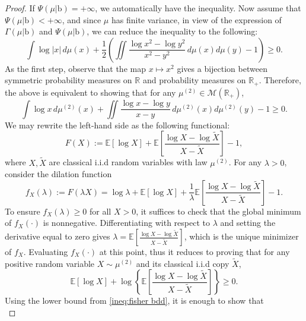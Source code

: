 \documentclass[10pt, reqno]{amsart}
\numberwithin{equation}{section}
\theoremstyle{definition}
\theoremstyle{plain}
\theoremstyle{remark}
\newcommand{\R}{\mathbb{R}}
\newcommand{\E}{\mathbb{E}}
\newcommand{\1}{\mathbbm{1}}
\begin{document}
	\begin{proof}
    If $\Psi(\mu|\mathbb{\mathrm{b}})=+\infty$, we automatically have the inequality. Now assume that $\Psi(\mu|\mathbb{\mathrm{b}})<+\infty$, and since $\mu$ has finite variance, in view of the expression of $\Gamma(\mu|\mathbb{\mathrm{b}})$ and $\Psi(\mu|\mathbb{\mathrm{b}})$, we can reduce the inequality to the following:
	\begin{equation*}
		\int \log|x|\,d\mu(x)+\frac{1}{2}\left( \iint \frac{\log x^2-\log y^2}{x^2-y^2}\,d\mu(x)d\mu(y)-1 \right)\geq 0.
	\end{equation*}
		As the first step, observe that the map $x\mapsto x^2$ gives a bijection between symmetric probability measures on $\R$ and probability measures on $\R_+$. Therefore, the above is equivalent to showing that for any $\mu^{(2)}\in\mathcal{M}(\R_+)$,
		\begin{equation*}
			\int \log x\,d\mu^{(2)}(x)+\iint \frac{\log x-\log y}{x-y}\,d\mu^{(2)}(x)d\mu^{(2)}(y)-1 \geq 0.
		\end{equation*}
		We may rewrite the left-hand side as the following functional:
		\begin{equation*}
			F(X):=\E[\log X]+\E\left[\frac{\log X -\log \tilde{X}}{X-\tilde{X}}\right]-1,
		\end{equation*}
		where $X,\tilde{X}$ are classical i.i.d random variables with law $\mu^{(2)}$. For any $\lambda>0$, consider the dilation function
		\begin{equation*}
			f_{X}(\lambda):=F(\lambda X)=\log \lambda+ \E[\log X]+ \frac{1}{\lambda} \E\left[\frac{\log X-\log \tilde{X}}{X-\tilde{X}}\right]-1.
		\end{equation*}
		To ensure $f_X(\lambda)\ge 0$ for all $X>0$, it suffices to check that the global minimum of $f_X(\cdot)$ is nonnegative. Differentiating with respect to $\lambda$ and setting the derivative equal to zero gives  $\lambda= \E\left[\frac{\log X-\log \tilde{X}}{X-\tilde{X}}\right]$, which is the unique minimizer of $f_X$. Evaluating $f_X(\cdot)$ at this point, thus it reduces to proving that for any positive random variable $X\sim \mu^{(2)}$ and its classical i.i.d copy $\tilde{X}$,
        \begin{equation}\label{ineq:equi LSI}
		 	\E[\log X]+\log\left\{ \E\left[ \frac{\log X-\log \tilde{X}}{X-\tilde{X}} \right] \right\}\geq 0.
		\end{equation}
		Using the lower bound from \eqref{ineq:fisher bdd}, it is enough to show that
	    \begin{equation*}

\end{equation*}
\end{proof}
\end{document}

